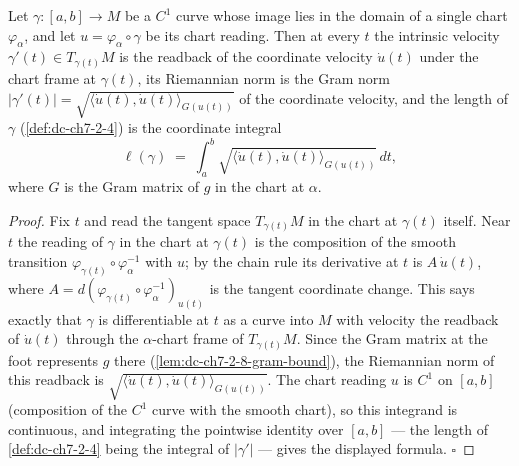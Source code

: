 \begin{lemma}
  \label{lem:dc-ch7-2-8-chart-length}
  \leanok
  Let $\gamma:[a,b]\to M$ be a $C^1$ curve whose image lies in the domain of a
  single chart $\varphi_\alpha$, and let $u=\varphi_\alpha\circ\gamma$ be its
  chart reading. Then at every $t$ the intrinsic velocity $\gamma'(t)\in
  T_{\gamma(t)}M$ is the readback of the coordinate velocity $\dot u(t)$ under
  the chart frame at $\gamma(t)$, its Riemannian norm is the Gram norm
  $|\gamma'(t)| = \sqrt{\langle\dot u(t),\dot u(t)\rangle_{G(u(t))}}$ of the
  coordinate velocity, and the length of $\gamma$ (\cref{def:dc-ch7-2-4}) is
  the coordinate integral
  $$
  \ell(\gamma)\;=\;\int_a^b \sqrt{\big\langle\dot u(t),\dot u(t)\big\rangle_{G(u(t))}}\,dt ,
  $$
  where $G$ is the Gram matrix of $g$ in the chart at $\alpha$.
\end{lemma}
\begin{proof}
  \leanok
  Fix $t$ and read the tangent space $T_{\gamma(t)}M$ in the chart at
  $\gamma(t)$ itself. Near $t$ the reading of $\gamma$ in the chart at
  $\gamma(t)$ is the composition of the smooth transition
  $\varphi_{\gamma(t)}\circ\varphi_\alpha^{-1}$ with $u$; by the chain rule its
  derivative at $t$ is $A\,\dot u(t)$, where
  $A=d(\varphi_{\gamma(t)}\circ\varphi_\alpha^{-1})_{u(t)}$ is the tangent
  coordinate change. This says exactly that $\gamma$ is differentiable at $t$
  as a curve into $M$ with velocity the readback of $\dot u(t)$ through the
  $\alpha$-chart frame of $T_{\gamma(t)}M$. Since the Gram matrix at the foot
  represents $g$ there (\cref{lem:dc-ch7-2-8-gram-bound}), the Riemannian norm
  of this readback is
  $\sqrt{\langle\dot u(t),\dot u(t)\rangle_{G(u(t))}}$. The chart reading $u$
  is $C^1$ on $[a,b]$ (composition of the $C^1$ curve with the smooth chart),
  so this integrand is continuous, and integrating the pointwise identity over
  $[a,b]$ — the length of \cref{def:dc-ch7-2-4} being the integral of
  $|\gamma'|$ — gives the displayed formula. $\square$
\end{proof}

